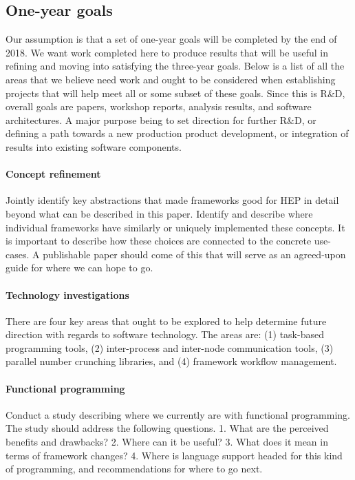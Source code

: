 \documentclass[12pt,a4paper]{article}
\begin{document}
\subsection{One-year goals}
\label{sec:one-year-goals}

Our assumption is that a set of one-year goals will be completed by
the end of 2018. We want work completed here to produce results that
will be useful in refining and moving into satisfying the three-year
goals.  Below is a list of all the areas that we believe need work and
ought to be considered when establishing projects that will help meet
all or some subset of these goals. Since this is R\&D, overall goals
are papers, workshop reports, analysis results, and software
architectures. A major purpose being to set direction for further
R\&D, or defining a path towards a new production product development,
or integration of results into existing software components.

\paragraph{Concept refinement} Jointly identify key abstractions that
made frameworks good for HEP in detail beyond what can be described in
this paper. Identify and describe where individual frameworks have
similarly or uniquely implemented these concepts. It is important to
describe how these choices are connected to the concrete use-cases. A
publishable paper should come of this that will serve as an agreed-upon
guide for where we can hope to go.

\paragraph{Technology investigations} There are four key areas that
ought to be explored to help determine future direction with regards
to software technology. The areas are: (1) task-based programming tools,
(2) inter-process and inter-node communication tools, (3) parallel number
crunching libraries, and (4) framework workflow management.

\paragraph{Functional programming} Conduct a study describing where we
currently are with functional programming. The study should address
the following questions. 1. What are the perceived benefits and
drawbacks?  2. Where can it be useful? 3. What does it mean in terms
of framework changes? 4. Where is language support headed for this
kind of programming, and recommendations for where to go next.
\end{document}
